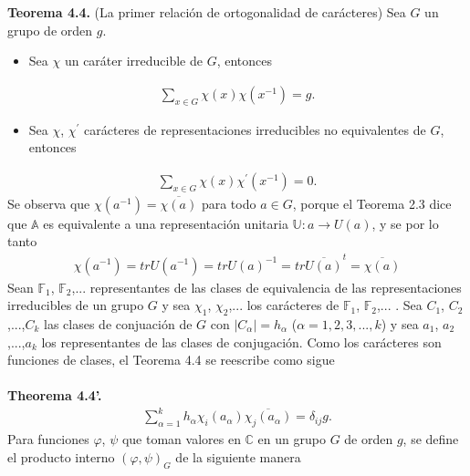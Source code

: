 \documentclass[12pt]{book}
\theoremstyle{definition}
\newcounter{in}
\begin{document}
\textbf{Teorema 4.4. } (La primer relación de ortogonalidad de carácteres) Sea $G$ un grupo de orden $g$.
\begin{itemize}
\item Sea $\chi$ un caráter irreducible de $G$, entonces 
\end{itemize}
\begin{equation*}
\begin{aligned}
\sum_{x \in G} \chi(x) \chi(x^{-1}) = g.
\end{aligned}
\end{equation*}
\begin{itemize}
\item Sea $\chi$, $\chi^{'}$ carácteres de representaciones irreducibles no equivalentes de $G$, entonces 
\end{itemize}
\begin{equation*}
\begin{aligned}
\sum_{x \in G} \chi(x) \chi^{'}(x^{-1}) = 0.
\end{aligned}
\end{equation*}
Se observa que $\chi(a^{-1})=\overline{\chi(a)}$ para todo $a \in G$, porque el Teorema 2.3 dice que $\mathbb{A}$ es equivalente a una representación unitaria $\mathbb{U}: a \rightarrow U(a)$, y se por lo tanto
\begin{equation*}
\begin{aligned}
\chi(a^{-1})=trU(a^{-1})=trU(a)^{-1}=tr \overline{U(a)}^{t} = \overline{\chi(a)}  
\end{aligned}
\end{equation*} 
Sean $\mathbb{F}_{1}$, $\mathbb{F}_{2}$,... representantes de las clases de equivalencia de las representaciones irreducibles de un grupo $G$ y sea $\chi_{1}$, $\chi_{2}$,... los carácteres de $\mathbb{F}_{1}$, $\mathbb{F}_{2}$,... .  Sea $C_{1}$, $C_{2}$,...,$C_{k}$ las clases de conjuación de $G$ con $|C_{\alpha}|=h_{\alpha}$ ($\alpha=1, 2, 3,...,k$) y sea $a_{1}$, $a_{2}$,...,$a_{k}$ los representantes de las clases de conjugación. Como los carácteres son funciones de clases, el Teorema 4.4 se reescribe como sigue\\~\\
\textbf{Theorema 4.4'. }
\begin{equation*}
\begin{aligned} 
\sum_{\alpha=1}^{k} h_{\alpha} \chi_{i}(a_{\alpha}) \overline{\chi_{j}(a_{\alpha})} = \delta_{ij}g.
\end{aligned}
\end{equation*}
Para funciones $\varphi$, $\psi$ que toman valores en $\mathbb{C}$ en un grupo $G$ de orden $g$, se define el producto interno $(\varphi,\psi)_{G}$ de la siguiente manera
\end{document}
